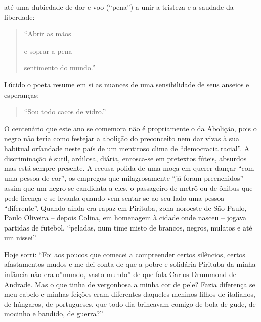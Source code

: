 \documentclass[
  letterpaper,
  DIV=11,
  numbers=noendperiod]{scrreprt}
\begin{document}
até uma dubiedade de dor e voo (``pena'') a unir a tristeza e a saudade
da liberdade:

\begin{quote}
``Abrir as mãos~

e soprar a pena~

sentimento do mundo.''
\end{quote}

Lúcido o poeta resume em si as nuances de uma sensibilidade de seus
anseios e esperanças:

\begin{quote}
``Sou todo cacos de vidro.''
\end{quote}

O centenário que este ano se comemora não é propriamente o da Abolição,
pois o negro não teria como festejar a abolição do preconceito nem dar
vivas à sua habitual orfandade neste país de um mentiroso clima de
``democracia racial''. A discriminação é sutil, ardilosa, diária,
enrosca-se em pretextos fúteis, absurdos mas está sempre presente. A
recusa polida de uma moça em querer dançar ``com uma pessoa de cor'', os
empregos que milagrosamente ``já foram preenchidos'' assim que um negro
se candidata a eles, o passageiro de metrô ou de ônibus que pede licença
e se levanta quando vem sentar-se ao seu lado uma pessoa ``diferente''.
Quando ainda era rapaz em Pirituba, zona noroeste de São Paulo, Paulo
Oliveira -- depois Colina, em homenagem à cidade onde nasceu -- jogava
partidas de futebol, ``peladas, num time misto de brancos, negros,
mulatos e até um nissei''.

Hoje sorri: ``Foi aos poucos que comecei a compreender certos silêncios,
certos afastamentos mudos e me dei conta de que a pobre e solidária
Pirituba da minha infância não era o''mundo, vasto mundo'' de que fala
Carlos Drummond de Andrade. Mas o que tinha de vergonhosa a minha cor de
pele? Fazia diferença se meu cabelo e minhas feições eram diferentes
daqueles meninos filhos de italianos, de húngaros, de portugueses, que
todo dia brincavam comigo de bola de gude, de mocinho e bandido, de
guerra?''
\end{document}
